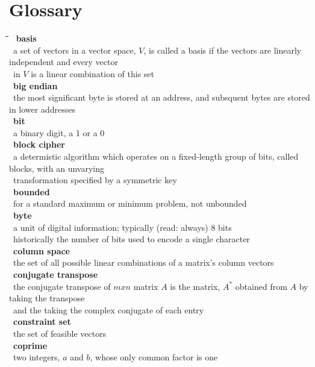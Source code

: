 \documentclass[10pt,letterpaper]{scrartcl}
\newcommand{\tbul}{\textbullet}
\newcommand{\tend}{\>\textendash}
\newcommand{\tabDef}{\hspace{2em}\=\hspace{2em}\=\hspace{2em}\=\hspace{2em}\=\kill}
\begin{document}
\newpage\section{Glossary}\begin{tabbing}\tabDef 
\tbul\ \textbf{basis} \\
    \tend\ a set of vectors in a vector space, $V$, is called a basis if the vectors are linearly independent and every vector \\ \>\ in $V$ is a linear combination of this set \\
\tbul\ \textbf{big endian} \\
    \tend\ the most significant byte is stored at an address, and subsquent bytes are stored in lower addresses\\
\tbul\ \textbf{bit} \\
    \tend\ a binary digit, a 1 or a 0 \\
\tbul\ \textbf{block cipher} \\
    \tend\ a determistic algorithm which operates on a fixed-length group of bits, called blocks, with an unvarying \\ \>\ transformation specified by a symmetric key \\
\tbul\ \textbf{bounded} \\
    \tend\ for a standard maximum or minimum problem, not unbounded \\
\tbul\ \textbf{byte} \\
    \tend\ a unit of digital information; typically (read: always) 8 bits \\
    \tend\ historically the number of bits used to encode a single character \\
\tbul\ \textbf{column space} \\
    \tend\ the set of all possible linear combinations of a matrix's column vectors \\
\tbul\ \textbf{conjugate transpose} \\
    \tend\ the conjugate transpose of $mxn$ matrix $A$ is the matrix, $A^*$ obtained from $A$ by taking the transpose \\ \>\ and the taking the complex conjugate of each entry \\
\tbul\ \textbf{constraint set} \\
    \tend\ the set of feasible vectors \\
\tbul\ \textbf{coprime} \\
    \tend\ two integers, $a$ and $b$, whose only common factor is one \\

\end{tabbing}
\end{document}
